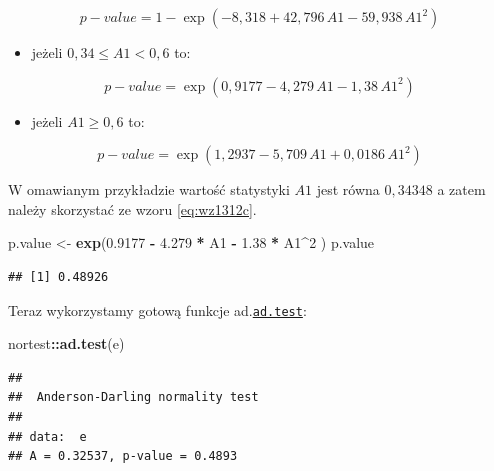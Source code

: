 \documentclass[polish,]{book}
\newenvironment{Shaded}{\begin{snugshade}}{\end{snugshade}}
\newcommand{\DecValTok}[1]{\textcolor[rgb]{0.00,0.00,0.81}{#1}}
\newcommand{\FloatTok}[1]{\textcolor[rgb]{0.00,0.00,0.81}{#1}}
\newcommand{\KeywordTok}[1]{\textcolor[rgb]{0.13,0.29,0.53}{\textbf{#1}}}
\newcommand{\NormalTok}[1]{#1}
\newcommand{\OperatorTok}[1]{\textcolor[rgb]{0.81,0.36,0.00}{\textbf{#1}}}
\newcommand{\StringTok}[1]{\textcolor[rgb]{0.31,0.60,0.02}{#1}}
\providecommand{\tightlist}{%
  \setlength{\itemsep}{0pt}\setlength{\parskip}{0pt}}
\begin{document}
\begin{equation}
p-value=1-\exp(-8,318+42,796\,A1-59,938\,A1^2)
\label{eq:wz1312b}
\end{equation}

\begin{itemize}
\tightlist
\item
  jeżeli \(0,34\leq A1 < 0,6\) to:
\end{itemize}

\begin{equation}
p-value=\exp(0,9177-4,279\,A1-1,38\,A1^2)
\label{eq:wz1312c}
\end{equation}

\begin{itemize}
\tightlist
\item
  jeżeli \(A1\geq 0,6\) to:
\end{itemize}

\begin{equation}
p-value= \exp(1,2937-5,709\,A1+0,0186\,A1^2)
\label{eq:wz1312d}
\end{equation}

W omawianym przykładzie wartość statystyki \(A1\) jest równa \(0,34348\) a zatem należy skorzystać ze wzoru \eqref{eq:wz1312c}.

\begin{Shaded}
\begin{Highlighting}[]
\NormalTok{p.value <-}\StringTok{ }\KeywordTok{exp}\NormalTok{(}\FloatTok{0.9177} \OperatorTok{-}\StringTok{ }\FloatTok{4.279} \OperatorTok{*}\StringTok{ }\NormalTok{A1 }\OperatorTok{-}\StringTok{ }\FloatTok{1.38} \OperatorTok{*}\StringTok{ }\NormalTok{A1}\OperatorTok{^}\DecValTok{2}\NormalTok{ )}
\NormalTok{p.value}
\end{Highlighting}
\end{Shaded}

\begin{verbatim}
## [1] 0.48926
\end{verbatim}

Teraz wykorzystamy gotową funkcje ad.\href{https://rdrr.io/cran/nortest/man/ad.test.html}{\texttt{ad.test}}:

\begin{Shaded}
\begin{Highlighting}[]
\NormalTok{nortest}\OperatorTok{::}\KeywordTok{ad.test}\NormalTok{(e)}
\end{Highlighting}
\end{Shaded}

\begin{verbatim}
## 
##  Anderson-Darling normality test
## 
## data:  e
## A = 0.32537, p-value = 0.4893
\end{verbatim}
\end{document}
